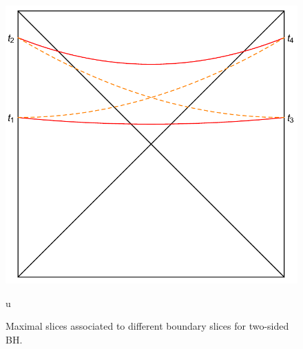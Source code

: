 \documentclass[8pt,aspectratio=169]{beamer}
\begin{document}
\begin{frame}
\begin{minipage}[t]{0.42\linewidth}
\begin{figure}
\begin{center}
        \includegraphics[scale=0.35]{SSA}    
    
    \end{center}
    \caption{Maximal slices associated to different boundary slices for two-sided BH.}
    \label{fig:WDW}u
\end{figure}

\end{minipage}

\end{frame}
\end{document}
